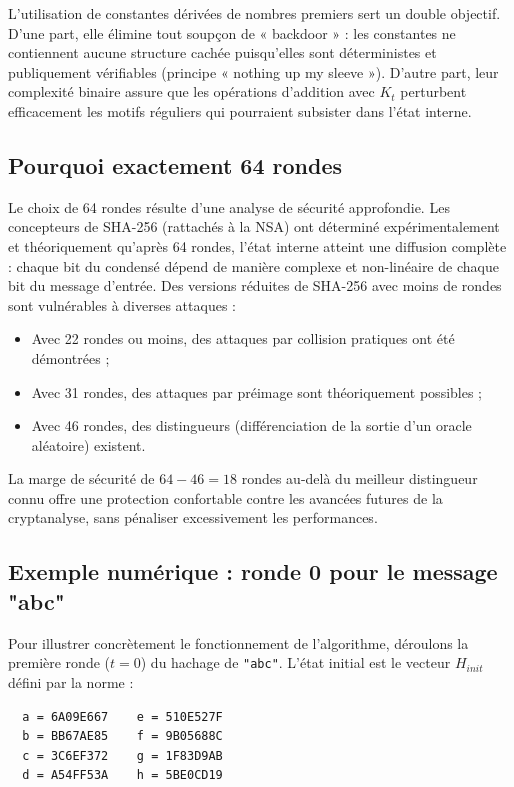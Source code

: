 L'utilisation de constantes dérivées de nombres premiers sert un double objectif. D'une part, elle élimine tout soupçon de « backdoor » : les constantes ne contiennent aucune structure cachée puisqu'elles sont déterministes et publiquement vérifiables (principe « nothing up my sleeve »). D'autre part, leur complexité binaire assure que les opérations d'addition avec $K_t$ perturbent efficacement les motifs réguliers qui pourraient subsister dans l'état interne.

\subsection{Pourquoi exactement 64 rondes}

Le choix de 64 rondes résulte d'une analyse de sécurité approfondie. Les concepteurs de SHA-256 (rattachés à la NSA) ont déterminé expérimentalement et théoriquement qu'après 64 rondes, l'état interne atteint une diffusion complète : chaque bit du condensé dépend de manière complexe et non-linéaire de chaque bit du message d'entrée. Des versions réduites de SHA-256 avec moins de rondes sont vulnérables à diverses attaques :

\begin{itemize}
    \item Avec 22 rondes ou moins, des attaques par collision pratiques ont été démontrées ;
    \item Avec 31 rondes, des attaques par préimage sont théoriquement possibles ;
    \item Avec 46 rondes, des distingueurs (différenciation de la sortie d'un oracle aléatoire) existent.
\end{itemize}

La marge de sécurité de $64 - 46 = 18$ rondes au-delà du meilleur distingueur connu offre une protection confortable contre les avancées futures de la cryptanalyse, sans pénaliser excessivement les performances.

\subsection{Exemple numérique : ronde 0 pour le message "abc"}

Pour illustrer concrètement le fonctionnement de l'algorithme, déroulons la première ronde ($t = 0$) du hachage de \texttt{"abc"}. L'état initial est le vecteur $H_{init}$ défini par la norme :

\begin{verbatim}
  a = 6A09E667    e = 510E527F
  b = BB67AE85    f = 9B05688C
  c = 3C6EF372    g = 1F83D9AB
  d = A54FF53A    h = 5BE0CD19
\end{verbatim}

